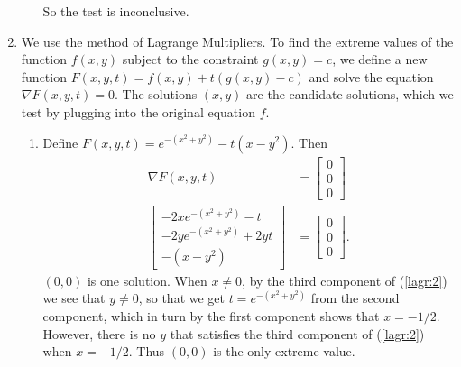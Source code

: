 \documentclass{article}
\begin{document}
\begin{enumerate}
\begin{enumerate}
  So the test is inconclusive.

 \end{enumerate}

\item

We use the method of Lagrange Multipliers.  To find the extreme values
of the function $f(x,y)$ subject to the constraint $g(x,y)=c$, we define
a new function $F(x,y,t) = f(x,y) + t(g(x,y) - c)$ and solve the equation
$\nabla F(x,y,t) = 0$.  The solutions $(x,y)$ are the candidate solutions,
which we test by plugging into the original equation $f$.

\begin{enumerate}
 \item
  Define $F(x,y,t) = e^{-(x^2+y^2)} - t(x - y^2)$.  Then
  \begin{align}
   \nabla F(x,y,t) &= \begin{bmatrix} 0 \\ 0 \\ 0 \end{bmatrix} \nonumber \\
   \begin{bmatrix}
    -2xe^{-(x^2+y^2)} - t \\
    -2ye^{-(x^2+y^2)} + 2yt \\
    -(x - y^2)
   \end{bmatrix} &= \begin{bmatrix} 0 \\ 0 \\ 0 \end{bmatrix}. \label{lagr:2}
  \end{align}
  $(0,0)$ is one solution.  When $x \neq 0$, by the third component of
  (\ref{lagr:2}) we see that $y \neq 0$, so that we get $t = e^{-(x^2+y^2)}$
  from the second component, which in turn by the first component shows
  that $x = -1/2$.  However, there is no $y$ that satisfies the third
  component of (\ref{lagr:2}) when $x = -1/2$.  Thus $(0, 0)$ is the only
  extreme value.
  

\end{enumerate}
\end{enumerate}
\end{document}
